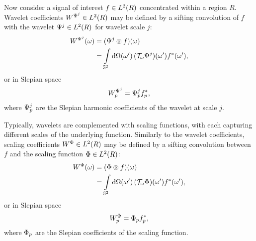 Now consider a signal of interest \(f \in \hilbert{R}\) concentrated within a region \(R\).
Wavelet coefficients \(W^{\Psi^{j}} \in \hilbert{R}\) may be defined by a sifting convolution of \(f\) with the wavelet \(\Psi^{j} \in \hilbert{R}\) for wavelet scale \(j\):
%
\begin{align}\label{eq:chapter3_slepian_wavelet_omega}
	\pixel{W^{\Psi^{j}}}
	 & = \pixel{\convolution{\Psi^{j}}{f}} \nonumber                                              \\
	 & = \integrateSphere{\omega'} \pixel[']{(\translation{\omega}\Psi^{j})} \pixel[']{\conj{f}},
\end{align}
%
or in Slepian space
%
\begin{equation}\label{eq:chapter3_slepian_wavelet_p}
	\slepian{W}^{\Psi^{j}}
	= \slepian{\Psi}^{j} \conj{\slepian{f}},
\end{equation}
%
where \(\slepian{\Psi}^{j}\) are the Slepian harmonic coefficients of the wavelet at scale \(j\).

Typically, wavelets are complemented with scaling functions, with each capturing different scales of the underlying function.
Similarly to the wavelet coefficients, scaling coefficients \(W^{\Phi} \in \hilbert{R}\) may be defined by a sifting convolution between \(f\) and the scaling function \(\Phi \in \hilbert{R}\):
%
\begin{align}\label{eq:chapter3_slepian_scaling_omega}
	\pixel{W^{\Phi}}
	 & = \pixel{\convolution{\Phi}{f}} \nonumber                                              \\
	 & = \integrateSphere{\omega'} \pixel[']{(\translation{\omega}\Phi)} \pixel[']{\conj{f}},
\end{align}
%
or in Slepian space
%
\begin{equation}\label{eq:chapter3_slepian_scaling_p}
	\slepian{W}^{\Phi}
	= \slepian{\Phi} \conj{\slepian{f}},
\end{equation}
%
where \(\slepian{\Phi}\) are the Slepian coefficients of the scaling function.

